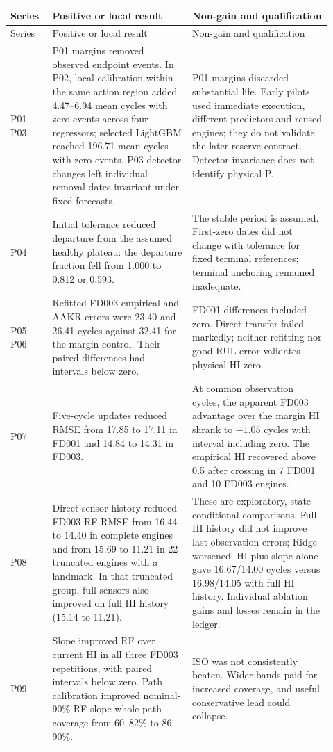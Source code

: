 \documentclass[12pt]{article}
\begin{document}
\small
\begin{longtable}{@{}p{0.12\linewidth}p{0.40\linewidth}p{0.40\linewidth}@{}}
\toprule
Series & Positive or local result & Non-gain and qualification \\
\midrule
\endfirsthead
\toprule
Series & Positive or local result & Non-gain and qualification \\
\midrule
\endhead
P01--P03 & P01 margins removed observed endpoint events. In P02, local calibration within the same action region added 4.47--6.94 mean cycles with zero events across four regressors; selected LightGBM reached 196.71 mean cycles with zero events. P03 detector changes left individual removal dates invariant under fixed forecasts. & P01 margins discarded substantial life. Early pilots used immediate execution, different predictors and reused engines; they do not validate the later reserve contract. Detector invariance does not identify physical P. \\
P04 & Initial tolerance reduced departure from the assumed healthy plateau: the departure fraction fell from 1.000 to 0.812 or 0.593. & The stable period is assumed. First-zero dates did not change with tolerance for fixed terminal references; terminal anchoring remained inadequate. \\
P05--P06 & Refitted FD003 empirical and AAKR errors were 23.40 and 26.41 cycles against 32.41 for the margin control. Their paired differences had intervals below zero. & FD001 differences included zero. Direct transfer failed markedly; neither refitting nor good RUL error validates physical HI zero. \\
P07 & Five-cycle updates reduced RMSE from 17.85 to 17.11 in FD001 and 14.84 to 14.31 in FD003. & At common observation cycles, the apparent FD003 advantage over the margin HI shrank to $-1.05$ cycles with interval including zero. The empirical HI recovered above 0.5 after crossing in 7 FD001 and 10 FD003 engines. \\
P08 & Direct-sensor history reduced FD003 RF RMSE from 16.44 to 14.40 in complete engines and from 15.69 to 11.21 in 22 truncated engines with a landmark. In that truncated group, full sensors also improved on full HI history (15.14 to 11.21). & These are exploratory, state-conditional comparisons. Full HI history did not improve last-observation errors; Ridge worsened. HI plus slope alone gave 16.67/14.00 cycles versus 16.98/14.05 with full HI history. Individual ablation gains and losses remain in the ledger. \\
P09 & Slope improved RF over current HI in all three FD003 repetitions, with paired intervals below zero. Path calibration improved nominal-90\% RF-slope whole-path coverage from 60--82\% to 86--90\%. & ISO was not consistently beaten. Wider bands paid for increased coverage, and useful conservative lead could collapse. \\

\end{longtable}
\end{document}
